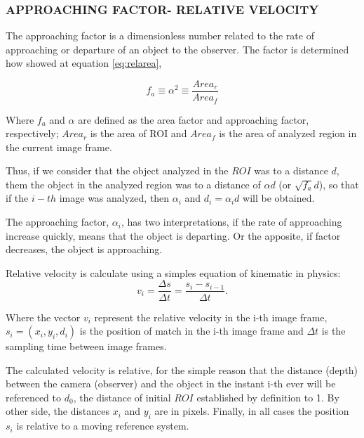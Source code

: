 
\subsubsection{APPROACHING FACTOR- RELATIVE VELOCITY}
The approaching factor is a dimensionless number related to the rate of approaching 
or departure of an object to the observer. The factor
is determined how showed at equation \ref{eq:relarea},

\begin{equation}\label{eq:relarea}
f_a \equiv \alpha^2 \equiv \frac{Area_r}{Area_f} 
\end{equation}

Where $f_a$ and $\alpha$ are defined as the area factor and approaching factor, 
respectively; $Area_r$ is the area of ROI and $Area_f$ 
is the area of analyzed region in the current image frame. 

Thus, if we consider that the object analyzed in the $ROI$ was to a distance $d$,
them the object in the analyzed region was to a distance of $\alpha d$ (or $\sqrt{f_a} d$),
so that if the $i-th$ image was analyzed, then $\alpha_i$ and $d_i=\alpha_i d$ will be obtained.

The approaching factor, $\alpha_i$, has two interpretations, if the rate of approaching increase quickly, 
means that the object is departing. Or the apposite, if factor decreases, the 
object is approaching.

Relative velocity is calculate using a simples equation of kinematic in physics:
\begin{equation}
 v_i = \frac{\Delta s}{\Delta t}= \frac{s_i-s_{i-1}}{\Delta t}.
\end{equation}

Where the vector $v_i$ represent the relative velocity in the i-th image frame, 
$s_i=(x_i,y_i,d_i)$ is the position of match in the i-th image frame
and $\Delta t$ is the sampling time between image frames.

The calculated velocity  is relative, for the simple reason that the distance (depth) between the 
camera (observer) and the object in the instant i-th ever will be referenced to $d_0$, the distance of
initial $ROI$ established by definition to 1. By other side, the distances $x_i$ and $y_i$ are in pixels. 
Finally, in all cases the position $s_i$ is relative to a moving reference system.

